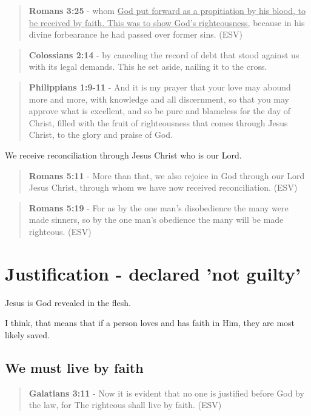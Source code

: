 \documentclass[11pt]{article}
\begin{document}
\begin{quote}
\textbf{Romans 3:25} -  whom \uline{God put forward as a propitiation by his blood, to be received by faith.  This was to show God's righteousness,} because in his divine forbearance he had passed over former sins.  (ESV)
\end{quote}

\begin{quote}
\textbf{Colossians 2:14} - by canceling the record of debt that stood against us with its legal demands. This he set aside, nailing it to the cross.
\end{quote}

\begin{quote}
\textbf{Philippians 1:9-11} - And it is my prayer that your love may abound more and more, with knowledge and all discernment, so that you may approve what is excellent, and so be pure and blameless for the day of Christ, filled with the fruit of righteousness that comes through Jesus Christ, to the glory and praise of God.
\end{quote}

We receive reconciliation through Jesus Christ who is our Lord.

\begin{quote}
\textbf{Romans 5:11} - More than that, we also rejoice in God through our Lord Jesus Christ, through whom we have now received reconciliation. (ESV)
\end{quote}

\begin{quote}
\textbf{Romans 5:19} - For as by the one man's disobedience the many were made sinners, so by the one man's obedience the many will be made righteous. (ESV)
\end{quote}

\section{Justification - declared 'not guilty'}
\label{sec:org0facc01}
Jesus is God revealed in the flesh.

I think, that means that if a person loves and has faith in Him, they are most likely saved.

\subsection{We must \textbf{live} by faith}
\label{sec:orgf06545c}
\begin{quote}
\textbf{Galatians 3:11} - Now it is evident that no one is justified before God by the law, for The righteous shall live by faith. (ESV)
\end{quote}
\end{document}
